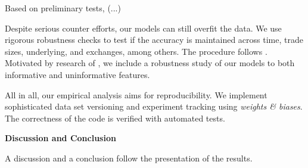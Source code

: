Based on preliminary tests, (...)

Despite serious counter efforts, our models can still overfit the data. We use rigorous robustness checks to test if the accuracy is maintained across time, trade sizes, underlying, and exchanges, among others. The procedure follows \textcites{grauerOptionTradeClassification2022}{savickasInferringDirectionOption2003}{chakrabartyTradeClassificationAlgorithms2012}{ronenMachineLearningTrade2022}. Motivated by research of \textcite{grinsztajnWhyTreebasedModels}, we include a robustness study of our models to both informative and uninformative features.

All in all, our empirical analysis aims for reproducibility. We implement sophisticated data set versioning and experiment tracking using \textit{weights \& biases}. The correctness of the code is verified with automated tests. 

\textbf{Discussion and Conclusion}

A discussion and a conclusion follow the presentation of the results.


